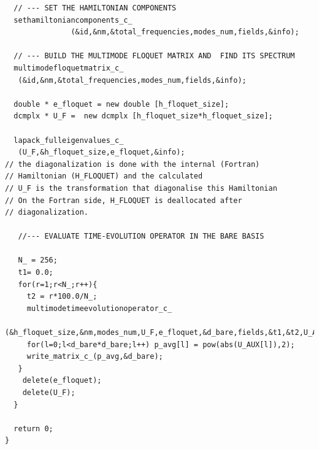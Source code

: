 \documentclass[pra,twocolumn,showkeys,preprintnumbers, amsmath,amssymb, aps,A4paper]{revtex4-1}
\begin{document}
\begin{widetext}
\begin{verbatim}
  // --- SET THE HAMILTONIAN COMPONENTS
  sethamiltoniancomponents_c_
               (&id,&nm,&total_frequencies,modes_num,fields,&info);
    
  // --- BUILD THE MULTIMODE FLOQUET MATRIX AND  FIND ITS SPECTRUM     
  multimodefloquetmatrix_c_
   (&id,&nm,&total_frequencies,modes_num,fields,&info);

  double * e_floquet = new double [h_floquet_size];
  dcmplx * U_F =  new dcmplx [h_floquet_size*h_floquet_size];
    
  lapack_fulleigenvalues_c_
   (U_F,&h_floquet_size,e_floquet,&info);
// the diagonalization is done with the internal (Fortran)
// Hamiltonian (H_FLOQUET) and the calculated
// U_F is the transformation that diagonalise this Hamiltonian
// On the Fortran side, H_FLOQUET is deallocated after
// diagonalization. 

   //--- EVALUATE TIME-EVOLUTION OPERATOR IN THE BARE BASIS

   N_ = 256;
   t1= 0.0;
   for(r=1;r<N_;r++){      
     t2 = r*100.0/N_;
     multimodetimeevolutionoperator_c_
       (&h_floquet_size,&nm,modes_num,U_F,e_floquet,&d_bare,fields,&t1,&t2,U_AUX,&info);
     for(l=0;l<d_bare*d_bare;l++) p_avg[l] = pow(abs(U_AUX[l]),2);
     write_matrix_c_(p_avg,&d_bare);           
   }
    delete(e_floquet);    
    delete(U_F);
  }
  
  return 0;
}

\end{verbatim}
\end{widetext}
\end{document}
